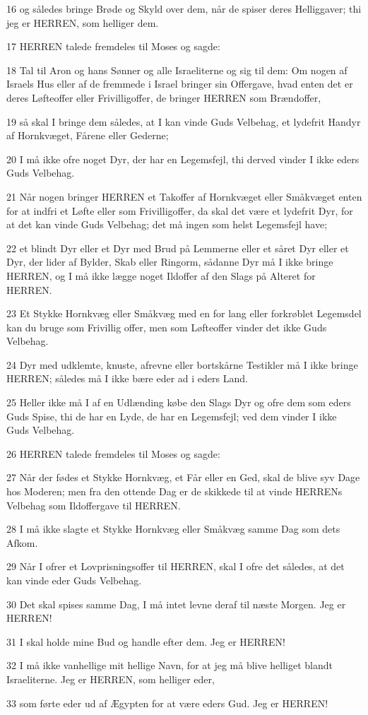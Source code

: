 \par 16 og således bringe Brøde og Skyld over dem, når de spiser deres Helliggaver; thi jeg er HERREN, som helliger dem.
\par 17 HERREN talede fremdeles til Moses og sagde:
\par 18 Tal til Aron og hans Sønner og alle Israeliterne og sig til dem: Om nogen af Israels Hus eller af de fremmede i Israel bringer sin Offergave, hvad enten det er deres Løfteoffer eller Frivilligoffer, de bringer HERREN som Brændoffer,
\par 19 så skal I bringe dem således, at I kan vinde Guds Velbehag, et lydefrit Handyr af Hornkvæget, Fårene eller Gederne;
\par 20 I må ikke ofre noget Dyr, der har en Legemsfejl, thi derved vinder I ikke eders Guds Velbehag.
\par 21 Når nogen bringer HERREN et Takoffer af Hornkvæget eller Småkvæget enten for at indfri et Løfte eller som Frivilligoffer, da skal det være et lydefrit Dyr, for at det kan vinde Guds Velbehag; det må ingen som helst Legemsfejl have;
\par 22 et blindt Dyr eller et Dyr med Brud på Lemmerne eller et såret Dyr eller et Dyr, der lider af Bylder, Skab eller Ringorm, sådanne Dyr må I ikke bringe HERREN, og I må ikke lægge noget Ildoffer af den Slags på Alteret for HERREN.
\par 23 Et Stykke Hornkvæg eller Småkvæg med en for lang eller forkrøblet Legemsdel kan du bruge som Frivillig offer, men som Løfteoffer vinder det ikke Guds Velbehag.
\par 24 Dyr med udklemte, knuste, afrevne eller bortskårne Testikler må I ikke bringe HERREN; således må I ikke bære eder ad i eders Land.
\par 25 Heller ikke må I af en Udlænding købe den Slags Dyr og ofre dem som eders Guds Spise, thi de har en Lyde, de har en Legemsfejl; ved dem vinder I ikke Guds Velbehag.
\par 26 HERREN talede fremdeles til Moses og sagde:
\par 27 Når der fødes et Stykke Hornkvæg, et Får eller en Ged, skal de blive syv Dage hos Moderen; men fra den ottende Dag er de skikkede til at vinde HERRENs Velbehag som Ildoffergave til HERREN.
\par 28 I må ikke slagte et Stykke Hornkvæg eller Småkvæg samme Dag som dets Afkom.
\par 29 Når I ofrer et Lovprisningsoffer til HERREN, skal I ofre det således, at det kan vinde eder Guds Velbehag.
\par 30 Det skal spises samme Dag, I må intet levne deraf til næste Morgen. Jeg er HERREN!
\par 31 I skal holde mine Bud og handle efter dem. Jeg er HERREN!
\par 32 I må ikke vanhellige mit hellige Navn, for at jeg må blive helliget blandt Israeliterne. Jeg er HERREN, som helliger eder,
\par 33 som førte eder ud af Ægypten for at være eders Gud. Jeg er HERREN!

